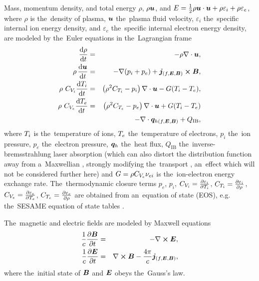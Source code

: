 Mass, momentum density, and total energy 
$\rho$, $\rho\boldsymbol{u}$, and 
$E = \frac{1}{2}\rho\boldsymbol{u}\cdot\boldsymbol{u} + 
 \rho \varepsilon_i + \rho \varepsilon_e$, 
where $\rho$ is 
the~density of plasma, $\boldsymbol{u}$ the~plasma fluid velocity, $\varepsilon_i$ 
the~specific internal ion energy density, 
and $\varepsilon_e$ the~specific internal 
electron energy density,
are modeled by the~Euler equations in the~Lagrangian frame 
\cite{Holec_DGBGKT_2016, Holec_PoPNTH2018}
\begin{eqnarray}
 \frac{\text{d} \rho}{\text{d} t} &=& - \rho\nabla\cdot\boldsymbol{u}
 , 
 \label{eq:NTH_rho}\\
 \rho\, \frac{\text{d} \boldsymbol{u}}{\text{d} t} &=& - \nabla (p_i + p_e) 
 + \boldsymbol{j}_{(f, \boldsymbol{E}, \boldsymbol{B})} \boldsymbol{\times}\boldsymbol{B}
 ,  
 \label{eq:NTH_v}\\
 \rho~C_{V_i}\frac{\text{d} T_i}{\text{d} t} 
 &=& 
 \left(\rho^2 C_{T_i} - p_i\right)\nabla\cdot\boldsymbol{u} 
 - G(T_i - T_e)
 ,  
 \label{eq:NTH_Ti}\\
 \rho~C_{V_e} \frac{\text{d} T_e}{\text{d} t}
  &=& 
 \left(\rho^2 C_{T_e} - p_e \right) \nabla\cdot\boldsymbol{u}  
 + G(T_i - T_e)
 \nonumber\\ 
 && - \nabla\cdot\boldsymbol{q}_{h(f, \boldsymbol{E}, \boldsymbol{B})} + Q_{\text{IB}} 
 , 
 \label{eq:NTH_Te}
\end{eqnarray}
where $T_i$ is the~temperature of ions, $T_e$ the~temperature of electrons,
$p_i$ the~ion pressure, $p_e$ the~electron pressure,
$\boldsymbol{q}_h$ the~heat flux, $Q_{\text{IB}}$ the~inverse-bremsstrahlung laser 
absorption (which can also distort the distribution function away from 
a~Maxwellian \cite{Langdon80}, strongly modifying the~transport 
\cite{Ridgers08_2}, an~effect which will not be considered further here) and 
$G = \rho C_{V_e} \nu_{ei}$ is 
the~ion-electron energy exchange rate. 
The~thermodynamic closure terms 
$p_e$, $p_i$, 
$C_{V_i} = \frac{\partial \varepsilon_i}{\partial T_i}$, 
$C_{T_i} = \frac{\partial{\varepsilon_i}}{\partial{\rho}}$,
$C_{V_e} = \frac{\partial \varepsilon_e}{\partial T_e}$, 
$C_{T_e} = \frac{\partial{\varepsilon_e}}{\partial{\rho}}$
are obtained from an~equation of state (EOS), e.g.
the~SESAME equation of state tables
\cite{T4_SESAME_83, Lyon_SESAME_EOS_database-TechRep-92}.

The~magnetic and electric fields are modeled by Maxwell equations
\begin{eqnarray}
  \frac{1}{c}\frac{\partial \boldsymbol{B}}{\partial t} &=& - \nabla\boldsymbol{\times}\boldsymbol{E}
  ,
  \label{eq:Faraday} \\
  \frac{1}{c}\frac{\partial \boldsymbol{E}}{\partial t} &=& \nabla\boldsymbol{\times}\boldsymbol{B} - \frac{4\pi}{c}
  \boldsymbol{j}_{(f, \boldsymbol{E}, \boldsymbol{B})}
  ,
  \label{eq:Ampere}
\end{eqnarray}
where the~initial state of $\boldsymbol{B}$ and $\boldsymbol{E}$ obeys the~Gauss's law.


